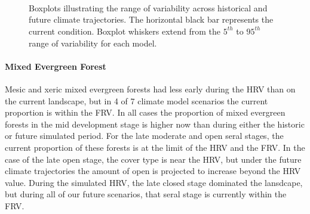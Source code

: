\begin{figure}[htbp]
  \centering
   \\
   \\
    \\
    \caption{Boxplots illustrating the range of variability across historical and future climate trajectories. The horizontal black bar represents the current condition. Boxplot whiskers extend from the $5^{th}$ to $95^{th}$ range of variability for each model. }
  \label{fig:covcond_rfrx}
\end{figure} %

\paragraph{Mixed Evergreen Forest} Mesic and xeric mixed evergreen forests had less early during the HRV than on the current landscape, but in 4 of 7 climate model scenarios the current proportion is within the FRV. In all cases the proportion of mixed evergreen forests in the mid development stage is higher now than during either the historic or future simulated period. For the late moderate and open seral stages, the current proportion of these forests is at the limit of the HRV and the FRV. In the case of the late open stage, the cover type is near the HRV, but under the future climate trajectories the amount of open is projected to increase beyond the HRV value. During the simulated HRV, the late closed stage dominated the lansdcape, but during all of our future scenarios, that seral stage is currently within the FRV. 

